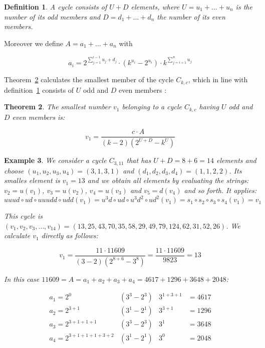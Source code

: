 \documentclass[12pt]{amsart}
\newtheorem{theorem}{Theorem}[section]
\newtheorem{definition}[theorem]{Definition}
\newtheorem{example}[theorem]{Example}
\theoremstyle{definition}
\begin{document}
\begin{definition}
\label{def:odd_even_elements}
A cycle consists of $U+D$ elements, where $U=u_1+\ldots+u_n$ is the number of its odd members and $D=d_1+\ldots+d_n$ the number of its even members.
\end{definition}

\par\noindent
Moreover we define $A=a_1+\ldots+a_n$ with

\[
a_i=2^{\sum_{j=1}^{i-1}u_j+d_j}\cdot\left(k^{u_i}-2^{u_i}\right)\cdot k^{\sum_{j=i+1}^{n}u_j}
\]

\par\medskip\noindent
Theorem~\ref{theo:v1} calculates the smallest member of the cycle $C_{k,c}$, which in line with definition~\ref{def:odd_even_elements} consists of $U$ odd and $D$ even members \cite{Ref_Gupta_2020}:

\begin{theorem}
\label{theo:v1}
The smallest number $v_1$ belonging to a cycle $C_{k,c}$ having $U$ odd and $D$ even members is:

\[
v_1=\frac{c\cdot A}{(k-2)(2^{U+D}-k^U)}
\]
\end{theorem}

\par\medskip
\begin{example}
\label{ex:C_3_11}
We consider a cycle $C_{3,11}$ that has $U+D=8+6=14$ elements and choose $(u_1,u_2,u_3,u_4)=(3,1,3,1)$ and $(d_1,d_2,d_3,d_4)=(1,1,2,2)$. Its smalles element is $v_1=13$ and we obtain all elements by evaluating the strings: $v_2=u(v_1)$, $v_3=u(v_2)$, $v_4=u(v_3)$ and $v_5=d(v_4)$ and so forth. It applies:
\[
uuud\circ ud\circ uuudd\circ udd(v_1)=u^3d\circ ud\circ u^3d^2\circ ud^2(v_1)=s_1\circ s_2\circ s_3\circ s_4(v_1)=v_1
\]

\par\noindent
This cycle is $(v_1,v_2,v_3,\ldots,v_{14})=(13,25,43,70,35,58,29,49,79,124,62,31,52,26)$. We calculate $v_1$ directly as follows:

\[
v_1=\frac{11\cdot 11609}{(3-2)(2^{8+6}-3^8)}=\frac{11\cdot11609}{9823}=13
\]

\par\noindent
In this case $11609=A=a_1+a_2+a_3+a_4=4617+1296+3648+2048$:

\[
\begin{array}{llll}
a_1=2^{0}&(3^3-2^3)&3^{1+3+1}&=4617\\
a_2=2^{3+1}&(3^1-2^1)&3^{3+1}&=1296\\
a_3=2^{3+1+1+1}&(3^3-2^3)&3^{1}&=3648\\
a_4=2^{3+1+1+1+3+2}&(3^1-2^1)&3^{0}&=2048
\end{array}
\]
\end{example}
\end{document}
